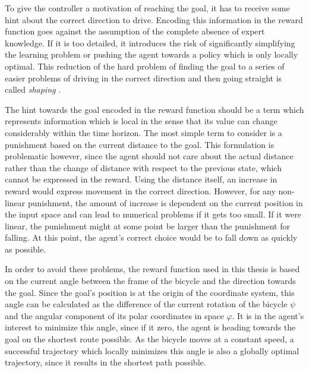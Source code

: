 To give the controller a motivation of reaching the goal, it has to receive some hint about the correct direction to drive.
Encoding this information in the reward function goes against the assumption of the complete absence of expert knowledge.
If it is too detailed, it introduces the risk of significantly simplifying the learning problem or pushing the agent towards a policy which is only locally optimal.
This reduction of the hard problem of finding the goal to a series of easier problems of driving in the correct direction and then going straight is called \emph{shaping} \cite{sutton_reinforcement_1998,randlov_learning_1998}.

The hint towards the goal encoded in the reward function should be a term which represents information which is local in the sense that its value can change considerably within the time horizon.
The most simple term to consider is a punishment based on the current distance to the goal.
This formulation is problematic however, since the agent should not care about the actual distance rather than the change of distance with respect to the previous state, which cannot be expressed in the reward.
Using the distance itself, an increase in reward would express movement in the correct direction.
However, for any non-linear punishment, the amount of increase is dependent on the current position in the input space and can lead to numerical problems if it gets too small.
If it were linear, the punishment might at some point be larger than the punishment for falling.
At this point, the agent's correct choice would be to fall down as quickly as possible.

In order to avoid these problems, the reward function used in this thesis is based on the current angle between the frame of the bicycle and the direction towards the goal.
Since the goal's position is at the origin of the coordinate system, this angle can be calculated as the difference of the current rotation of the bicycle $\psi$ and the angular component of its polar coordinates in space $\varphi$.
It is in the agent's interest to minimize this angle, since if it zero, the agent is heading towards the goal on the shortest route possible.
As the bicycle moves at a constant speed, a successful trajectory which locally minimizes this angle is also a globally optimal trajectory, since it results in the shortest path possible.

